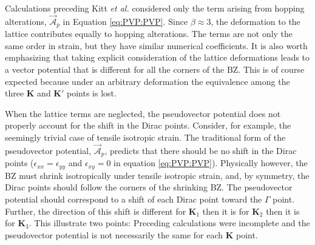 Calculations preceding Kitt \textit{et al.} \cite{Kitt2012} considered only the term arising from hopping alterations, $\vec{\mathcal{A}}_p$ in Equation \ref{eq:PVP:PVP}.
Since $\beta \approx 3$, the deformation to the lattice contributes equally to hopping alterations.
The terms are not only the same order in strain, but they have similar numerical coefficients.
It is also worth emphasizing that taking explicit consideration of the lattice deformations leads to a vector potential that is different for all the corners of the BZ.
This is of course expected because under an arbitrary deformation the equivalence among the three $\bm{K}$ and $\bm{K'}$ points is lost.

When the lattice terms are neglected, the pseudovector potential does not properly account for the shift in the Dirac points.
Consider, for example, the seemingly trivial case of tensile isotropic strain.
The traditional form of the pseudovector potential, $\vec{\mathcal{A}}_p$, predicts that there should be no shift in the Dirac points ($\epsilon_{xx}=\epsilon_{yy}$ and $\epsilon_{xy}=0$ in equation \ref{eq:PVP:PVP}).
Physically however, the BZ must shrink isotropically under tensile isotropic strain, and, by symmetry, the Dirac points should follow the corners of the shrinking BZ.
The pseudovector potential should correspond to a shift of each Dirac point toward the $\Gamma$ point.
Further, the direction of this shift is different for $\bm{K}_1$ then it is for $\bm{K}_2$ then it is for $\bm{K}_3$. 
This illustrate two points: Preceding calculations were incomplete and the pseudovector potential is not necessarily the same for each $\bm{K}$ point.

